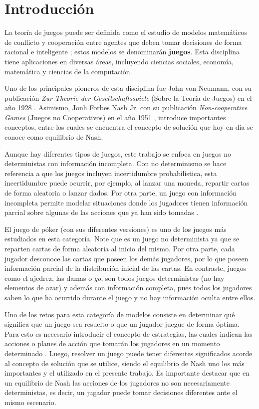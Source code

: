 \chapter*{Introducción}

La teoría de juegos puede ser definida como el estudio de modelos matemáticos de conflicto y cooperación entre agentes que deben tomar decisiones de forma racional e inteligente \cite[p.~1]{bib:game-theory-book}; estos modelos se denominarán \textbf{juegos}. Esta disciplina tiene aplicaciones en diversas áreas, incluyendo ciencias sociales, economía, matemática y ciencias de la computación.

Uno de los principales pioneros de esta disciplina fue John von Neumann, con su publicación \textit{Zur Theorie der Gesellschaftsspiele} (Sobre la Teoría de Juegos) en el año 1928 \cite{bib:von-neumann}. Asimismo, Jonh Forbes Nash Jr. con su publicación \textit{Non-cooperative Games} (Juegos no Cooperativos) en el año 1951 \cite{bib:nash}, introduce importantes conceptos, entre los cuales se encuentra el concepto de solución que hoy en día se conoce como equilibrio de Nash.

Aunque hay diferentes tipos de juegos, este trabajo se enfoca en juegos no deterministas con información incompleta. Con no determinismo se hace referencia a que los juegos incluyen incertidumbre probabilística, esta incertidumbre puede ocurrir, por ejemplo, al lanzar una moneda, repartir cartas de forma aleatoria o lanzar dados. Por otra parte, un juego con información incompleta permite modelar situaciones donde los jugadores tienen información parcial sobre algunas de las acciones que ya han sido tomadas \cite[p.~199]{bib:course-game-theory}.

El juego de póker (con sus diferentes versiones) es uno de los juegos más estudiados en esta categoría. Note que es un juego no determinista ya que se reparten cartas de forma aleatoria al inicio del mismo. Por otra parte, cada jugador desconoce las cartas que poseen los demás jugadores, por lo que poseen información parcial de la distribución inicial de las cartas. En contraste, juegos como el ajedrez, las damas o \textit{go}, son todos juegos deterministas (no hay elementos de azar) y además con información completa, pues todos los jugadores saben lo que ha ocurrido durante el juego y no hay información oculta entre ellos.

Uno de los retos para esta categoría de modelos consiste en determinar qué significa que un juego sea resuelto o que un jugador juegue de forma óptima. Para esto es necesario introducir el concepto de estrategias, las cuales indican las acciones o planes de acción que tomarán los jugadores en un momento determinado \cite[p.~24]{bib:teoria-juegos-es}. Luego, resolver un juego puede tener diferentes significados acorde al concepto de solución que se utilice, siendo el equilibrio de Nash uno los más importantes y el utilizado en el presente trabajo. Es importante destacar que en un equilibrio de Nash las acciones de los jugadores no son necesariamente deterministas, es decir, un jugador puede tomar decisiones diferentes ante el mismo escenario.

